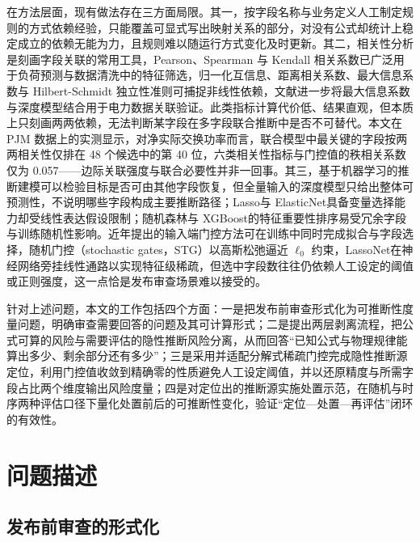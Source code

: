 \documentclass[UTF8,zihao=5,twoside]{ctexart}
\begin{document}
在方法层面，现有做法存在三方面局限。其一，按字段名称与业务定义人工制定规则的方式依赖经验，只能覆盖可显式写出映射关系的部分，对没有公式却统计上稳定成立的依赖无能为力，且规则难以随运行方式变化及时更新。其二，相关性分析是刻画字段关联的常用工具，Pearson、Spearman 与 Kendall 相关系数\cite{ref-pearson,ref-spearman,ref-kendall}已广泛用于负荷预测与数据清洗中的特征筛选\cite{ref-lan-load,ref-jiao-pv,ref-deng-load}，归一化互信息\cite{ref-cover-info}、距离相关系数\cite{ref-szekely-dcorr}、最大信息系数\cite{ref-reshef-mic}与 Hilbert-Schmidt 独立性准则\cite{ref-gretton-hsic}可捕捉非线性依赖，文献\cite{ref-xing-micdnn}进一步将最大信息系数与深度模型结合用于电力数据关联验证。此类指标计算代价低、结果直观，但本质上只刻画两两依赖，无法判断某字段在多字段联合推断中是否不可替代。本文在 PJM 数据上的实测显示，对净实际交换功率而言，联合模型中最关键的字段按两两相关性仅排在 48 个候选中的第 40 位，六类相关性指标与门控值的秩相关系数仅为 0.057——边际关联强度与联合必要性并非一回事。其三，基于机器学习的推断建模可以检验目标是否可由其他字段恢复\cite{ref-lecun-deep,ref-goodfellow-deep,ref-wang-meter}，但全量输入的深度模型只给出整体可预测性，不说明哪些字段构成主要推断路径；Lasso\cite{ref-tibshirani-lasso}与 ElasticNet\cite{ref-zou-enet}具备变量选择能力却受线性表达假设限制；随机森林\cite{ref-breiman-rf}与 XGBoost\cite{ref-chen-xgboost}的特征重要性排序易受冗余字段与训练随机性影响。近年提出的输入端门控方法可在训练中同时完成拟合与字段选择，随机门控（stochastic gates，STG）\cite{ref-stg}以高斯松弛逼近 $\ell_0$ 约束，LassoNet\cite{ref-lassonet}在神经网络旁挂线性通路以实现特征级稀疏，但选中字段数往往仍依赖人工设定的阈值或正则强度，这一点恰是发布审查场景难以接受的。

针对上述问题，本文的工作包括四个方面：一是把发布前审查形式化为可推断性度量问题，明确审查需要回答的问题及其可计算形式；二是提出两层剥离流程，把公式可算的风险与需要评估的隐性推断风险分离，从而回答“已知公式与物理规律能算出多少、剩余部分还有多少”；三是采用并适配分解式稀疏门控完成隐性推断源定位，利用门控值收敛到精确零的性质避免人工设定阈值，并以还原精度与所需字段占比两个维度输出风险度量；四是对定位出的推断源实施处置示范，在随机与时序两种评估口径下量化处置前后的可推断性变化，验证“定位—处置—再评估”闭环的有效性。

\section{问题描述}

\subsection{发布前审查的形式化}
\end{document}
